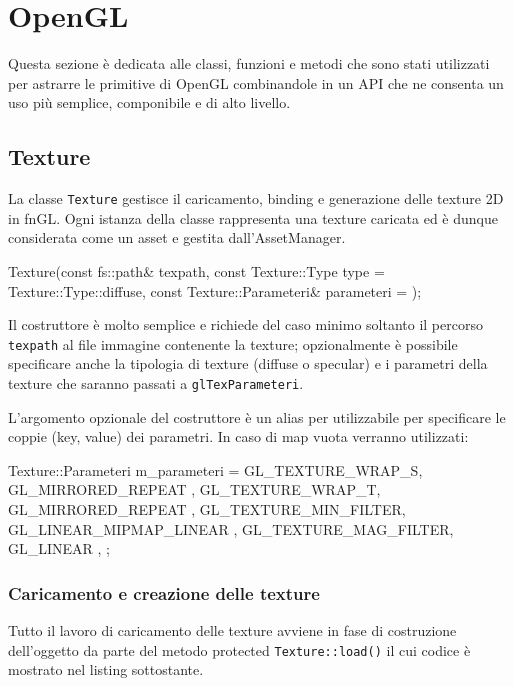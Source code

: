 \section{OpenGL}
Questa sezione è dedicata alle classi, funzioni e metodi che sono stati utilizzati per astrarre le primitive di OpenGL combinandole in un API che ne consenta un uso più semplice, componibile e di alto livello.

\subsection{Texture}
La classe \texttt{Texture} gestisce il caricamento, binding e generazione delle texture 2D in fnGL. Ogni istanza della classe rappresenta una texture caricata ed è dunque considerata come un asset e gestita dall'AssetManager.
\begin{cpp}
 Texture(const fs::path& texpath, 
         const Texture::Type type = Texture::Type::diffuse, 
         const Texture::Parameteri& parameteri = {});
\end{cpp}
Il costruttore è molto semplice e richiede del caso minimo soltanto il percorso \texttt{texpath} al file immagine contenente la texture; opzionalmente è possibile specificare anche la tipologia di texture (diffuse o specular) e i parametri della texture che saranno passati a \texttt{glTexParameteri}.

L'argomento opzionale  del costruttore è un alias per  utilizzabile per specificare le coppie (key, value) dei parametri. In caso di map vuota verranno utilizzati:
\begin{cpp}
 Texture::Parameteri m_parameteri = {
	{ GL_TEXTURE_WRAP_S, GL_MIRRORED_REPEAT },
	{ GL_TEXTURE_WRAP_T, GL_MIRRORED_REPEAT },
	{ GL_TEXTURE_MIN_FILTER, GL_LINEAR_MIPMAP_LINEAR },
	{ GL_TEXTURE_MAG_FILTER, GL_LINEAR },
 };
\end{cpp} 

\subsubsection{Caricamento e creazione delle texture}
Tutto il lavoro di caricamento delle texture avviene in fase di costruzione dell'oggetto da parte del metodo protected \texttt{Texture::load()} il cui codice è mostrato nel listing sottostante.

